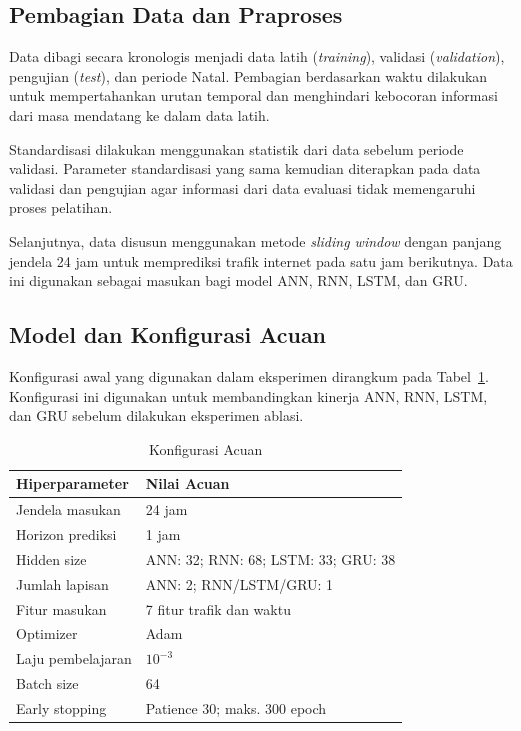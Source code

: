 \documentclass[conference,a4paper]{IEEEtran}
\begin{document}
\subsection{Pembagian Data dan Praproses}

Data dibagi secara kronologis menjadi data latih
(\textit{training}), validasi (\textit{validation}), pengujian
(\textit{test}), dan periode Natal. Pembagian berdasarkan waktu
dilakukan untuk mempertahankan urutan temporal dan menghindari
kebocoran informasi dari masa mendatang ke dalam data latih.

Standardisasi dilakukan menggunakan statistik dari data
sebelum periode validasi. Parameter standardisasi yang sama
kemudian diterapkan pada data validasi dan pengujian agar
informasi dari data evaluasi tidak memengaruhi proses pelatihan.

Selanjutnya, data disusun menggunakan metode \textit{sliding window}
dengan panjang jendela 24 jam untuk memprediksi trafik internet
pada satu jam berikutnya. Data ini digunakan sebagai masukan
bagi model ANN, RNN, LSTM, dan GRU.

\subsection{Model dan Konfigurasi Acuan}

Konfigurasi awal yang digunakan dalam eksperimen dirangkum
pada Tabel~\ref{tab:acuan}. Konfigurasi ini digunakan untuk
membandingkan kinerja ANN, RNN, LSTM, dan GRU sebelum
dilakukan eksperimen ablasi.

\begin{table}[!t]
    \centering
    \caption{Konfigurasi Acuan}
    \label{tab:acuan}
    \footnotesize
    \begin{tabular}{ll}
        \toprule
        Hiperparameter & Nilai Acuan \\
        \midrule
        Jendela masukan & 24 jam \\
        Horizon prediksi & 1 jam \\
        Hidden size & ANN: 32; RNN: 68; LSTM: 33; GRU: 38 \\
        Jumlah lapisan & ANN: 2; RNN/LSTM/GRU: 1 \\
        Fitur masukan & 7 fitur trafik dan waktu \\
        Optimizer & Adam \\
        Laju pembelajaran & $10^{-3}$ \\
        Batch size & 64 \\
        Early stopping & Patience 30; maks. 300 epoch \\
        \bottomrule
    \end{tabular}
\end{table}
\end{document}
